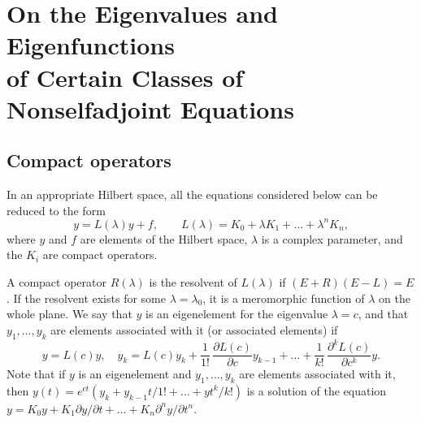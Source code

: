 \appendix
\chapter[Nonselfadjoint Equations]%
{On the Eigenvalues and Eigenfunctions\\
of Certain Classes of Nonselfadjoint Equations}

\section{Compact operators} In an appropriate Hilbert space, all 
the equations considered below can be reduced to the 
form
\begin{equation}
y=L(\lambda)y+f,\qquad L(\lambda)=K_0+\lambda K_1+\dots+\lambda^n
K_n,
\end{equation}
where $y$ and $f$ are elements of the Hilbert space, 
$\lambda$ is a complex parameter, and the $K_i$ are
compact operators.

A compact operator $R(\lambda)$ is the resolvent of 
$L(\lambda)$ if $(E+R)(E-L)=E$.  If the resolvent exists
for some $\lambda=\lambda_0$, it is a meromorphic function
of $\lambda$ on the whole plane.  We say that $y$ is
an eigenelement for the eigenvalue $\lambda=c$, and that
$y_1,\dots,y_k$ are elements associated with it (or
associated elements) if 
\begin{equation}
y=L(c)y,\quad y_k=L(c)y_k+\frac{1}{1!}\,\frac{\partial L(c)}{\partial c}
y_{k-1}+\dots+\frac{1}{k!}\,\frac{\partial^kL(c)}{\partial c^k}y.
\end{equation}
Note that if $y$ is an eigenelement and $y_1,\dots,y_k$
are elements associated with it, then $y(t)=e^{ct}(y_k
+y_{k-1}t/1!+\dots+yt^k/k!)$ is a solution of the equation
$y=K_0y+K_1\partial y/\partial t+\dots+K_n\partial^ny/
\partial t^n$.

\endinput
